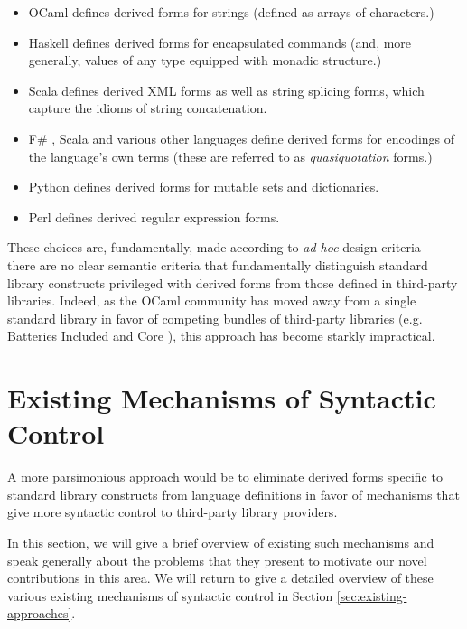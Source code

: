 \begin{itemize}
\item OCaml \cite{ocaml-manual} defines derived forms for strings (defined as arrays of characters.)
\item Haskell \cite{jones2003haskell} defines derived forms for encapsulated commands (and, more generally, values of any type equipped with monadic structure.)
\item Scala \cite{odersky2008programming} defines derived XML forms as well as string splicing forms, which capture the idioms of string concatenation.
\item F\# \cite{syme2012expert}, Scala \cite{shabalin2013quasiquotes} and various other languages define derived forms for encodings of the language's own terms (these are referred to as \emph{quasiquotation} forms.)
\item Python \cite{python} defines derived forms for mutable sets and dictionaries.
\item Perl \cite{perlre} defines derived regular expression forms.
\end{itemize}

These choices are, fundamentally, made according to \emph{ad hoc} design criteria -- there are no clear semantic criteria that fundamentally distinguish standard library constructs privileged with derived forms from those defined in third-party libraries. 
Indeed, as the OCaml community has moved away from a single standard library in favor of competing bundles of third-party libraries (e.g. Batteries Included \cite{OCaml-batteries} and Core \cite{OCaml-core}), this approach has become starkly impractical.%

\section{Existing Mechanisms of Syntactic Control}
A more parsimonious approach would be to eliminate derived forms  specific to standard library constructs from language definitions in favor of mechanisms that give more syntactic control to third-party library providers.

In this section, we will give a brief overview of existing such mechanisms and speak generally about the problems that they present to motivate our novel contributions in this area. We will return to give a detailed overview of these various existing mechanisms of syntactic control in Section \ref{sec:existing-approaches}. 

